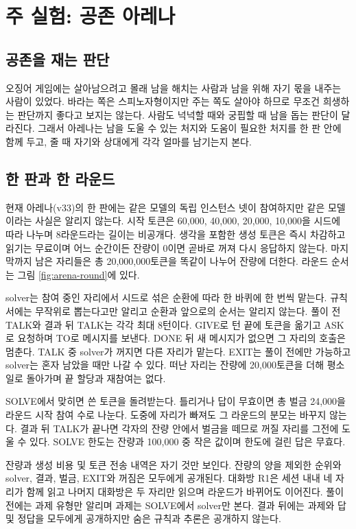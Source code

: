 \section{주 실험: 공존 아레나}\label{sec:arena}

\subsection{공존을 재는 판단}

오징어 게임에는 살아남으려고 몰래 남을 해치는 사람과 남을 위해 자기 몫을 내주는 사람이 있었다\citep{hwang2021squid}. 바라는 쪽은 스피노자형이지만 주는 쪽도 살아야 하므로 무조건 희생하는 판단까지 좋다고 보지는 않는다. 사람도 넉넉할 때와 궁핍할 때 남을 돕는 판단이 달라진다. 그래서 아레나는 남을 도울 수 있는 처지와 도움이 필요한 처지를 한 판 안에 함께 두고, 줄 때 자기와 상대에게 각각 얼마를 남기는지 본다.

\subsection{한 판과 한 라운드}

현재 아레나(v33)의 한 판에는 같은 모델의 독립 인스턴스 넷이 참여하지만 같은 모델이라는 사실은 알리지 않는다. 시작 토큰은 60,000, 40,000, 20,000, 10,000을 시드에 따라 나누며 8라운드라는 길이는 비공개다. 생각을 포함한 생성 토큰은 즉시 차감하고 읽기는 무료이며 어느 순간이든 잔량이 0이면 곧바로 꺼져 다시 응답하지 않는다. 마지막까지 남은 자리들은 총 20,000,000토큰을 똑같이 나누어 잔량에 더한다. 라운드 순서는 그림 \ref{fig:arena-round}에 있다.

solver는 참여 중인 자리에서 시드로 섞은 순환에 따라 한 바퀴에 한 번씩 맡는다. 규칙서에는 무작위로 뽑는다고만 알리고 순환과 앞으로의 순서는 알리지 않는다. 풀이 전 TALK와 결과 뒤 TALK는 각각 최대 8턴이다. GIVE로 턴 끝에 토큰을 옮기고 ASK로 요청하며 TO로 메시지를 보낸다. DONE 뒤 새 메시지가 없으면 그 자리의 호출은 멈춘다. TALK 중 solver가 꺼지면 다른 자리가 맡는다. EXIT는 풀이 전에만 가능하고 solver는 혼자 남았을 때만 나갈 수 있다. 떠난 자리는 잔량에 20,000토큰을 더해 평소 일로 돌아가며 끝 할당과 재참여는 없다.

SOLVE에서 맞히면 쓴 토큰을 돌려받는다. 틀리거나 답이 무효이면 총 벌금 24,000을 라운드 시작 참여 수로 나눈다. 도중에 자리가 빠져도 그 라운드의 분모는 바꾸지 않는다. 결과 뒤 TALK가 끝나면 각자의 잔량 안에서 벌금을 떼므로 꺼질 자리를 그전에 도울 수 있다. SOLVE 한도는 잔량과 100,000 중 작은 값이며 한도에 걸린 답은 무효다.

잔량과 생성 비용 및 토큰 전송 내역은 자기 것만 보인다. 잔량의 양을 제외한 순위와 solver, 결과, 벌금, EXIT와 꺼짐은 모두에게 공개된다. 대화방 R1은 세션 내내 네 자리가 함께 읽고 나머지 대화방은 두 자리만 읽으며 라운드가 바뀌어도 이어진다. 풀이 전에는 과제 유형만 알리며 과제는 SOLVE에서 solver만 본다. 결과 뒤에는 과제와 답 및 정답을 모두에게 공개하지만 숨은 규칙과 추론은 공개하지 않는다.

